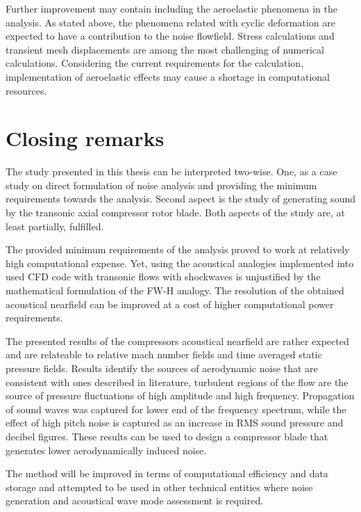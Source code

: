Further improvement may contain including the aeroelastic phenomena in the analysis. As stated above, the phenomena related with cyclic deformation are expected to have a contribution to the noise flowfield. Stress calculations and transient mesh displacements are among the most challenging of numerical calculations. Considering the current requirements for the calculation, implementation of aeroelastic effects may cause a shortage in computational resources.

\section{Closing remarks}
The study presented in this thesis can be interpreted two-wise. One, as a case study on direct formulation of noise analysis and providing the minimum requirements towards the analysis. Second aspect is the study of generating sound by the transonic axial compressor rotor blade. Both aspects of the study are, at least partially, fulfilled.

The provided minimum requirements of the analysis proved to work at relatively high computational expense. Yet, using the acoustical analogies implemented into used CFD code with transonic flows with shockwaves is unjustified by the mathematical formulation of the FW-H analogy. The resolution of the obtained acoustical nearfield can be improved at a cost of higher computational power requirements.

The presented results of the compressors acoustical nearfield are rather expected and are relateable to relative mach number fields and time averaged static pressure fields. Results identify the sources of aerodynamic noise that are consistent with ones described in literature, turbulent regions of the flow are the source of pressure fluctuations of high amplitude and high frequency. Propagation of sound waves was captured for lower end of the frequency spectrum, while the effect of high pitch noise is captured as an increase in RMS sound pressure and decibel figures. These results can be used to design a compressor blade that generates lower aerodynamically induced noise.

The method will be improved in terms of computational efficiency and data storage and attempted to be used in other technical entities where noise generation and acoustical wave mode assessment is required.